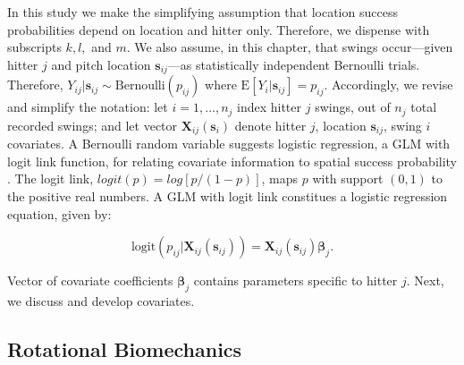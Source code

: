 In this study we make the simplifying assumption that location success probabilities depend on location and hitter only. Therefore, we dispense with subscripts $k, l,$ and $m$. We also assume, in this chapter, that swings occur---given hitter $j$ and pitch location $\pmb{s}_{ij}$---as statistically independent Bernoulli trials. Therefore, $Y_{ij}|\pmb{s}_{ij} \sim \text{Bernoulli}(p_{ij})$ where $\text{E}[Y_{i}|\pmb{s}_{ij}] = p_{ij}$. Accordingly, we revise and simplify the notation: let $i = 1, \dots, n_{j}$ index hitter $j$ swings, out of $n_{j}$ total recorded swings; and let vector $\pmb{X}_{ij}(\pmb{s}_{i})$ denote hitter $j$, location $\pmb{s}_{ij}$, swing $i$ covariates. A Bernoulli random variable suggests logistic regression, a GLM with logit link function, for relating covariate information to spatial success probability \citep{Myers2012}. The logit link, $logit(p) = log\left[p/(1-p)\right]$, maps $p$ with support $(0,1)$ to the positive real numbers. A GLM with logit link constitues a logistic regression equation, given by: 

\begin{equation}
\text{logit}(p_{ij}|\pmb{X}_{ij}(\pmb{s}_{ij})) = \pmb{X}_{ij}(\pmb{s}_{ij}) \pmb{\beta}_{j}.
\end{equation}

Vector of covariate coefficients $\pmb{\beta}_{j}$ contains parameters specific to hitter $j$. Next, we discuss and develop covariates.

\subsection{Rotational Biomechanics} %

